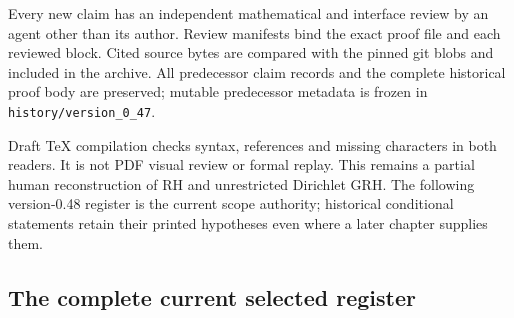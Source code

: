 Every new claim has an independent mathematical and interface review
by an agent other than its author. Review manifests bind the exact
proof file and each reviewed block. Cited source bytes are compared
with the pinned git blobs and included in the archive. All predecessor
claim records and the complete historical proof body are preserved;
mutable predecessor metadata is frozen in
\texttt{history/version\_0\_47}.

Draft TeX compilation checks syntax, references and missing characters
in both readers. It is not PDF visual review or formal replay.
This remains a partial human reconstruction of RH and unrestricted
Dirichlet GRH. The following version-0.48 register is the current
scope authority; historical conditional statements retain their
printed hypotheses even where a later chapter supplies them.

\subsection{The complete current selected register}

